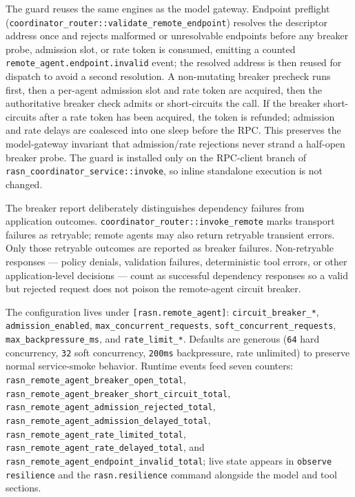 \documentclass[manuscript,screen,review]{acmart}
\begin{document}
The guard reuses the same engines as the model gateway. Endpoint preflight
(\texttt{coordinator\_router::validate\_remote\_endpoint}) resolves the descriptor
address once and rejects malformed or unresolvable endpoints before any breaker
probe, admission slot, or rate token is consumed, emitting a counted
\texttt{remote\_agent.endpoint.invalid} event; the resolved address is then reused
for dispatch to avoid a second resolution. A non-mutating breaker
precheck runs first, then a per-agent admission slot and rate token are acquired,
then the authoritative breaker check admits or short-circuits the call. If the
breaker short-circuits after a rate token has been acquired, the token is refunded;
admission and rate delays are coalesced into one sleep before the RPC. This
preserves the model-gateway invariant that admission/rate rejections never strand a
half-open breaker probe. The guard is installed only on the RPC-client branch of
\texttt{rasn\_coordinator\_service::invoke}, so inline standalone execution is not
changed.

The breaker report deliberately distinguishes dependency failures from
application outcomes. \texttt{coordinator\_router::invoke\_remote} marks transport
failures as retryable; remote agents may also return retryable transient errors.
Only those retryable outcomes are reported as breaker failures. Non-retryable
responses --- policy denials, validation failures, deterministic tool errors, or
other application-level decisions --- count as successful dependency responses so a
valid but rejected request does not poison the remote-agent circuit breaker.

The configuration lives under \texttt{[rasn.remote\_agent]}:
\texttt{circuit\_breaker\_*}, \texttt{admission\_enabled},
\texttt{max\_concurrent\_requests}, \texttt{soft\_concurrent\_requests},
\texttt{max\_backpressure\_ms}, and \texttt{rate\_limit\_*}. Defaults are generous
(\texttt{64} hard concurrency, \texttt{32} soft concurrency, \texttt{200ms}
backpressure, rate unlimited) to preserve normal service-smoke behavior. Runtime
events feed seven counters:
\texttt{rasn\_remote\_agent\_breaker\_open\_total},
\texttt{rasn\_remote\_agent\_breaker\_short\_circuit\_total},
\texttt{rasn\_remote\_agent\_admission\_rejected\_total},
\texttt{rasn\_remote\_agent\_admission\_delayed\_total},
\texttt{rasn\_remote\_agent\_rate\_limited\_total},
\texttt{rasn\_remote\_agent\_rate\_delayed\_total}, and
\texttt{rasn\_remote\_agent\_endpoint\_invalid\_total}; live state appears in
\texttt{observe resilience} and the \texttt{rasn.resilience} command alongside the
model and tool sections.
\end{document}
